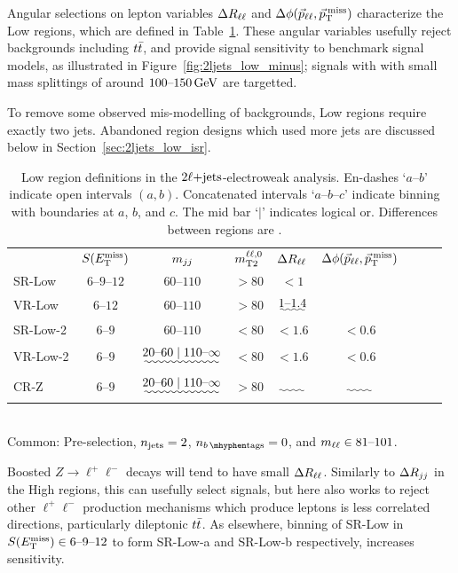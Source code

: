 Angular selections on lepton variables $\rll$ and $\dphillmet$ characterize
the Low regions, which are defined in Table~\ref{tab:2ljets_low}.
These angular variables usefully reject backgrounds including $\ttbar$, and
provide signal sensitivity to benchmark signal models, as illustrated in
Figure~\ref{fig:2ljets_low_minus};
signals with with small mass splittings of around $100\textrm{--}150\,\eV[G]$
are targetted.

To remove some observed mis-modelling of backgrounds, Low regions require
exactly two jets.
Abandoned region designs which used more jets are discussed below in
Section~\ref{sec:2ljets_low_isr}.

\begin{table}[tp]
\centering
\begin{tabular}{lcccccccc}
& $\metsig$
& $\mjj$
& $\mttwoll$
& $\rll$
& $\dphillmet$
\\[1em]
SR-Low
& $6\textrm{--}9\textrm{--}12$
& $60\textrm{--}110$
& $> 80$
& $< 1$
&
\\[0.5em]
\: VR-Low
& $6\textrm{--}12$
& $60\textrm{--}110$
& $>80$
& $\uwave{1\textrm{--}1.4}$
&
\\[1em]
SR-Low-2
& $6\textrm{--}9$
& $60\textrm{--}110$
& $< 80$
& $< 1.6$
& $< 0.6$
\\[0.5em]
\: VR-Low-2
& $6\textrm{--}9$
& $\uwave{20\textrm{--}60 \mid 110\textrm{--}\infty}$
& $< 80$
& $< 1.6$
& $< 0.6$
\\[1em]
CR-Z
& $6\textrm{--}9$
& $\uwave{20\textrm{--}60 \mid 110\textrm{--}\infty}$
& $> 80$
& $\uwave{\hphantom{< 1.6}}$
& $\uwave{\hphantom{< 0.6}}$
\end{tabular}
\\[1em]
Common: Pre-selection,
$\njet = 2$,
$\nbtag = 0$, and
$\mll \in 81\textrm{--}101$.
\caption[
Low region definitions in the $\twoljets$-electroweak analysis
]{%
Low region definitions in the $\twoljets$-electroweak analysis.
En-dashes `$a\textrm{--}b$' indicate open intervals $(a, b)$.
Concatenated intervals `$a\textrm{--}b\textrm{--}c$' indicate binning
with boundaries at $a$, $b$, and $c$.
The mid bar `$\mid$' indicates logical or.
Differences between regions are .
}
\label{tab:2ljets_low}
\end{table}

Boosted $Z\rightarrow \ell^+\ell^-$ decays will tend to have small $\rll$.
Similarly to $\rjj$ in the High regions, this can usefully select signals,
but here also works to reject other $\ell^+\ell^-$ production mechanisms which
produce leptons is less correlated directions, particularly dileptonic
$\ttbar$.
As elsewhere, binning of SR-Low in $\metsig \in 6\textrm{--}9\textrm{--}12$
to form SR-Low-a and SR-Low-b respectively, increases sensitivity.

